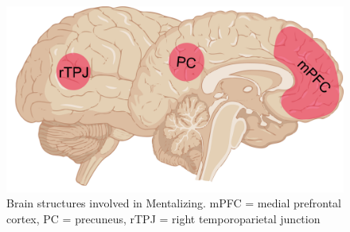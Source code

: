 \begin{figure}[!ht]
	\centering
	\includegraphics[width=.6\textwidth, clip=true]{./Chapters/01_Introduction/Images_MM/Mentalizing_network}
	\caption{Brain structures involved in Mentalizing. mPFC = medial prefrontal cortex, PC = precuneus, rTPJ = right temporoparietal junction}
    \vspace*{-10pt}
	\label{fig:mentalizing}
\end{figure}